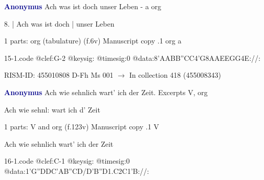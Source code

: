 \documentclass[twocolumn]{book}
\begin{document}
\newline \par \vspace{7pt} \textcolor{darkblue}{\textbf{Anonymus  }}
\newline Ach was ist doch unser Leben - a
\newline org
\newline \begin{itshape}[f.6v, at left:] 8. | Ach was ist doch | unser Leben\end{itshape} 
\newline \textcolor{darkblue}{}  1 parts: org (tabulature)  (f.6v)
\newline Manuscript copy
.1  org  a  
\begin{filecontents*}{15-1.code}
@clef:G-2
@keysig:
@timesig:0
@data:{8'AABB}{''CC}4'G{8AAEE}{GG}4E://:
\end{filecontents*}
\newline
%

\newline RISM-ID: 455010808
\newline D-Fh  Ms 001
\newline $\rightarrow$ In collection 418 (455008343)
      
\newline \par \vspace{7pt} \textcolor{darkblue}{\textbf{Anonymus  }}
\newline Ach wie sehnlich wart' ich der Zeit. Excerpts
\newline V, org
\newline \begin{itshape}[f.123v, heading:] Ach wie sehnl: wart ich d' Zeit\end{itshape} 
\newline \textcolor{darkblue}{}  1 parts: V and org  (f.123v)
\newline Manuscript copy
.1  V
\newline \begin{footnotesize} Ach wie sehnlich wart' ich der Zeit \end{footnotesize}  
\begin{filecontents*}{16-1.code}
@clef:C-1
@keysig:
@timesig:0
@data:1'G''DDC'AB''CD/D'B''D1.C2C1'B://:
\end{filecontents*}
\newline
%
\end{document}
